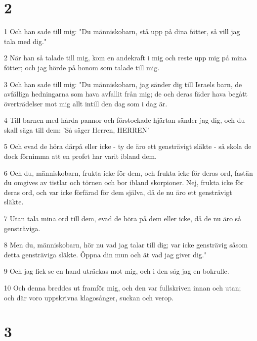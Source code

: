 \chapter{2}

\par 1 Och han sade till mig: "Du människobarn, stå upp på dina fötter, så vill jag tala med dig."
\par 2 När han så talade till mig, kom en andekraft i mig och reste upp mig på mina fötter; och jag hörde på honom som talade till mig.
\par 3 Och han sade till mig: "Du människobarn, jag sänder dig till Israels barn, de avfälliga hedningarna som hava avfallit från mig; de och deras fäder hava begått överträdelser mot mig allt intill den dag som i dag är.
\par 4 Till barnen med hårda pannor och förstockade hjärtan sänder jag dig, och du skall säga till dem: 'Så säger Herren, HERREN'
\par 5 Och evad de höra därpå eller icke - ty de äro ett gensträvigt släkte - så skola de dock förnimma att en profet har varit ibland dem.
\par 6 Och du, människobarn, frukta icke för dem, och frukta icke för deras ord, fastän du omgives av tistlar och törnen och bor ibland skorpioner. Nej, frukta icke för deras ord, och var icke förfärad för dem själva, då de nu äro ett gensträvigt släkte.
\par 7 Utan tala mina ord till dem, evad de höra på dem eller icke, då de nu äro så gensträviga.
\par 8 Men du, människobarn, hör nu vad jag talar till dig; var icke gensträvig såsom detta gensträviga släkte. Öppna din mun och ät vad jag giver dig."
\par 9 Och jag fick se en hand uträckas mot mig, och i den såg jag en bokrulle.
\par 10 Och denna breddes ut framför mig, och den var fullskriven innan och utan; och där voro uppskrivna klagosånger, suckan och verop.

\chapter{3}

